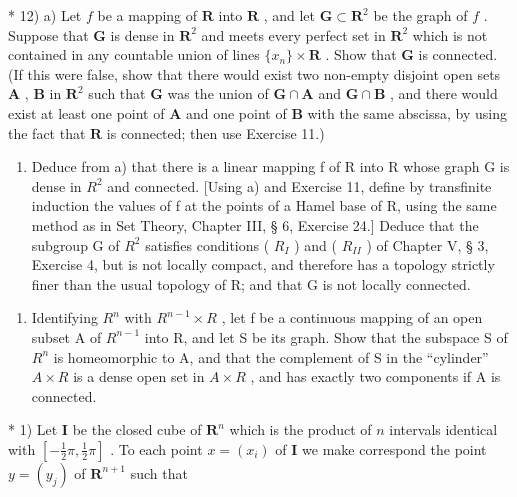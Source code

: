 * 12) a) Let \(f\) be a mapping of \(\mathbf{R}\) into \(\mathbf{R}\) , and let \(\mathbf{G} \subset \mathbf{R}^2\) be the graph of \(f\) . Suppose that \(\mathbf{G}\) is dense in \(\mathbf{R}^2\) and meets every perfect set in \(\mathbf{R}^2\) which is not contained in any countable union of lines \(\{x_n\} \times \mathbf{R}\) . Show that \(\mathbf{G}\) is connected. (If this were false, show that there would exist two non-empty disjoint open sets \(\mathbf{A}\) , \(\mathbf{B}\) in \(\mathbf{R}^2\) such that \(\mathbf{G}\) was the union of \(\mathbf{G} \cap \mathbf{A}\) and \(\mathbf{G} \cap \mathbf{B}\) , and there would exist at least one point of \(\mathbf{A}\) and one point of \(\mathbf{B}\) with the same abscissa, by using the fact that \(\mathbf{R}\) is connected; then use Exercise 11.)

\begin{enumerate}
\def\labelenumi{\alph{enumi})}
\setcounter{enumi}{1}
\tightlist
\item
  Deduce from a) that there is a linear mapping f of R into R whose graph G is dense in \(R^{2}\) and connected. {[}Using a) and Exercise 11, define by transfinite induction the values of f at the points of a Hamel base of R, using the same method as in Set Theory, Chapter III, § 6, Exercise 24.{]} Deduce that the subgroup G of \(R^{2}\) satisfies conditions ( \(R_{I}\) ) and ( \(R_{II}\) ) of Chapter V, § 3, Exercise 4, but is not locally compact, and therefore has a topology strictly finer than the usual topology of R; and that G is not locally connected.
\end{enumerate}

\begin{enumerate}
\def\labelenumi{\arabic{enumi})}
\setcounter{enumi}{12}
\tightlist
\item
  Identifying \(R^{n}\) with \(R^{n-1} \times R\) , let f be a continuous mapping of an open subset A of \(R^{n-1}\) into R, and let S be its graph. Show that the subspace S of \(R^{n}\) is homeomorphic to A, and that the complement of S in the ``cylinder'' \(A \times R\) is a dense open set in \(A \times R\) , and has exactly two components if A is connected.
\end{enumerate}

\ExerciseSection

* 1) Let \(\mathbf{I}\) be the closed cube of \(\mathbf{R}^n\) which is the product of \(n\) intervals identical with \([-\frac{1}{2}\pi, \frac{1}{2}\pi]\) . To each point \(x = (x_i)\) of \(\mathbf{I}\) we make correspond the point \(y = (y_j)\) of \(\mathbf{R}^{n+1}\) such that

